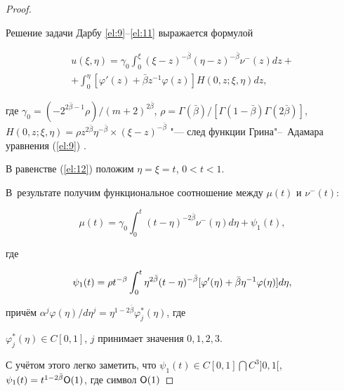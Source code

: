 \begin{proof}
\begin{equation}
\end{equation}



Решение задачи Дарбу \eqref{el:9}--\eqref{el:11} выражается формулой

\begin{multline} \label{el:12}

u(\xi,\eta)=\gamma_0\int_0^\xi(\xi-z)^{-\bar{\beta}}(\eta-z)^{-\bar{\beta}}\nu^-(z)dz+

\\

+\int_0^\eta[\varphi'(z)+\bar{\beta}z^{-1}\varphi(z)]H(0,z;\xi,\eta)dz,

\end{multline}

где $\gamma_0=(-2^{2\bar{\beta}-1}\rho)/(m+2)^{2\bar{\beta}}$, $\rho=\Gamma(\bar{\beta})/[\Gamma(1-\bar{\beta})\Gamma(2\bar{\beta})]$, $H(0,z;\xi,\eta)=\rho

z^{2\bar{\beta}}\eta^{-\bar{\beta}}\times(\xi-z)^{-\bar{\beta}}$ "--- след функции Грина"--~Адамара уравнения (\ref{el:9}) \cite{eleevbalk:bib:Eleev}.



В равенстве (\ref{el:12}) положим $\eta=\xi=t$, $0<t<1$.

В~результате получим функциональное соотношение между $\mu(t)$ и $\nu^-(t)$:

\begin{equation} \label{el:13}

\mu(t)=\gamma_0\int_0^t(t-\eta)^{-2\bar{\beta}}\nu^-(\eta)d\eta+\psi_1(t),

\end{equation}

где

\begin{equation} \notag

\psi_1(t)=\rho t^{-\beta}\int_0^t\eta^{2\bar{\beta}}(t-\eta)^{-\bar{\beta}}[\varphi'(\eta)+\bar{\beta}\eta^{-1}\varphi(\eta)]d\eta,

\end{equation}

причём $\alpha^j\varphi(\eta)/d\eta^j=\eta^{1-2\bar{\beta}}\varphi^{*}_j(\eta)$, где

$\varphi^{*}_j(\eta)\in C[0, 1]$, $j$ принимает значения $0, 1, 2, 3$.



С учётом этого легко заметить, что $\psi_1(t) \in C[0, 1]\bigcap C^3]0, 1[$, $\psi_1(t)=t^{1-2\bar{\beta}} {\sf O}(1)$, где символ ${\sf O}(1)$


\end{proof}
